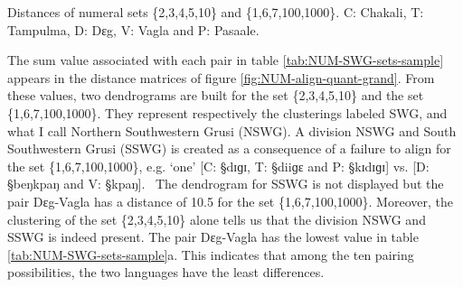 \begin{table}[htb]
\centering
\caption[Distances of numeral sets  \{2,3,4,5,10\} and  
\{1,6,7,100,1000\}]{Distances of numeral sets  \{2,3,4,5,10\} and  
\{1,6,7,100,1000\}. C: Chakali, T: Tampulma,
D: Dɛg, V: Vagla and
P: Pasaale. \label{tab:NUM-SWG-sets-sample}}


\end{table}


The sum value associated with each pair in table \ref{tab:NUM-SWG-sets-sample}
appears in the distance matrices of figure
\ref{fig:NUM-align-quant-grand}.  From these values, two  dendrograms are
built
for the set 
\{2,3,4,5,10\} and the set \{1,6,7,100,1000\}. They represent respectively 
the clusterings
labeled SWG, and what I call Northern Southwestern Grusi
(NSWG).  A  division NSWG and South Southwestern Grusi (SSWG) is created as a
consequence of a failure to align for the set \{1,6,7,100,1000\}, e.g. `one'
 [C: {\S dɪɡɪ},   T: {\S  diiɡɛ} and P: {\S kɪdɪɡɪ}] vs.    [D: {\S  beŋkpaŋ}
and
 V:
{\S kpaŋ}].   The dendrogram for SSWG is not displayed but the pair
Dɛg-Vagla has a distance of 10.5 for the set \{1,6,7,100,1000\}. Moreover, the
clustering of the set \{2,3,4,5,10\} alone tells us that the division NSWG and
SSWG is indeed present. The pair Dɛg-Vagla has the lowest value in table
\ref{tab:NUM-SWG-sets-sample}a. This indicates that among the ten pairing
possibilities, the two languages have the least differences. 



